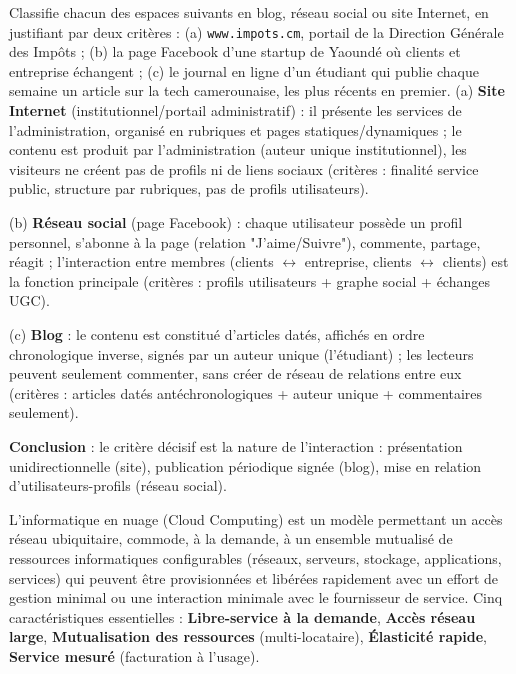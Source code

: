 \documentclass[11pt]{article}
\newcommand{\cle}[1]{{\popxbold\color{popdark}#1}}
\newcounter{popsec}
\newcounter{popsub}
\newcommand{\courssub}[1]{%
  \stepcounter{popsub}%
  \par\vspace{9pt}\noindent{\popxbold\fontsize{11.5}{13}\selectfont\color{popink}{\color{poporange}\thepopsec.\thepopsub}\hspace{6pt}#1}\par\nopagebreak\vspace{4pt}
}
\begin{document}
\begin{exoresolu}
Classifie chacun des espaces suivants en blog, réseau social ou site Internet, en justifiant par deux critères : 
(a) \texttt{www.impots.cm}, portail de la Direction Générale des Impôts ; 
(b) la page Facebook d'une startup de Yaoundé où clients et entreprise échangent ; 
(c) le journal en ligne d'un étudiant qui publie chaque semaine un article sur la tech camerounaise, les plus récents en premier.
\tcblower
(a) \textbf{Site Internet} (institutionnel/portail administratif) : il présente les services de l'administration, organisé en rubriques et pages statiques/dynamiques ; le contenu est produit par l'administration (auteur unique institutionnel), les visiteurs ne créent pas de profils ni de liens sociaux (critères : finalité service public, structure par rubriques, pas de profils utilisateurs).

(b) \textbf{Réseau social} (page Facebook) : chaque utilisateur possède un profil personnel, s'abonne à la page (relation "J'aime/Suivre"), commente, partage, réagit ; l'interaction entre membres (clients $\leftrightarrow$ entreprise, clients $\leftrightarrow$ clients) est la fonction principale (critères : profils utilisateurs + graphe social + échanges UGC).

(c) \textbf{Blog} : le contenu est constitué d'articles datés, affichés en ordre chronologique inverse, signés par un auteur unique (l'étudiant) ; les lecteurs peuvent seulement commenter, sans créer de réseau de relations entre eux (critères : articles datés antéchronologiques + auteur unique + commentaires seulement).

\textbf{Conclusion} : le critère décisif est la nature de l'interaction : présentation unidirectionnelle (site), publication périodique signée (blog), mise en relation d'utilisateurs-profils (réseau social).
\end{exoresolu}

\courssub{Cloud computing : définition, types et modèles}

\begin{definition}
L'informatique en nuage (\cle{Cloud Computing}) est un modèle permettant un accès réseau ubiquitaire, commode, à la demande, à un ensemble mutualisé de ressources informatiques configurables (réseaux, serveurs, stockage, applications, services) qui peuvent être provisionnées et libérées rapidement avec un effort de gestion minimal ou une interaction minimale avec le fournisseur de service.
Cinq caractéristiques essentielles : \textbf{Libre-service à la demande}, \textbf{Accès réseau large}, \textbf{Mutualisation des ressources} (multi-locataire), \textbf{Élasticité rapide}, \textbf{Service mesuré} (facturation à l'usage).
\end{definition}
\end{document}
